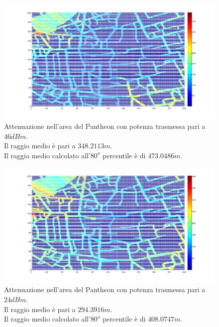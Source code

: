 \begin{figure}[!h]
\centering
\includegraphics[height=0.5\textwidth]{Immagini/Pantheon/attenuazione}
\caption{Attenuazione nell'area del Pantheon con potenza trasmessa pari a $46dBm$. \\
Il raggio medio è pari a $348.2113 m$.\\
Il raggio medio calcolato all'$80^o$ percentile è di $473.0486 m$.}
\label{img:attpantheon}
\end{figure}

\begin{figure}
\centering
\includegraphics[height=0.5\textwidth]{Immagini/Pantheon/attenuazione_pico}
\caption{Attenuazione nell'area del Pantheon con potenza trasmessa pari a $24dBm$. \\
Il raggio medio è pari a $294.3916 m$.\\
Il raggio medio calcolato all'$80^o$ percentile è di $408.0747 m$.}
\label{img:attpantheonpico}
\end{figure}

